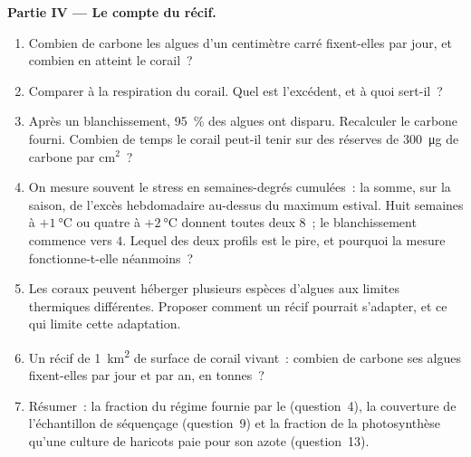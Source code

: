 \begin{problem}
\medskip
\noindent\textbf{Partie IV --- Le compte du récif.}
\begin{enumerate}[resume]
  \item Combien de carbone les algues d'un centimètre carré fixent-elles
        par jour, et combien en atteint le corail~?
  \item Comparer à la respiration du corail. Quel est l'excédent, et à
        quoi sert-il~?
  \item Après un blanchissement, \qty{95}{\%} des algues ont disparu.
        Recalculer le carbone fourni. Combien de temps le corail
        peut-il tenir sur des réserves de \qty{300}{\micro g} de
        carbone par cm$^{2}$~?
  \item On mesure souvent le stress en semaines-degrés cumulées~: la
        somme, sur la saison, de l'excès hebdomadaire au-dessus du
        maximum estival. Huit semaines à $+\qty{1}{\celsius}$ ou quatre
        à $+\qty{2}{\celsius}$ donnent toutes deux $8$~; le
        blanchissement commence vers $4$. Lequel des deux profils est le
        pire, et pourquoi la mesure fonctionne-t-elle néanmoins~?
  \item Les coraux peuvent héberger plusieurs espèces d'algues aux
        limites thermiques différentes. Proposer comment un récif
        pourrait s'adapter, et ce qui limite cette adaptation.
  \item Un récif de \qty{1}{km^2} de surface de corail vivant~: combien
        de carbone ses algues fixent-elles par jour et par an, en
        tonnes~?
  \item Résumer~: la fraction du régime fournie par le 
        (question~4), la couverture de l'échantillon de séquençage
        (question~9) et la fraction de la photosynthèse qu'une culture
        de haricots paie pour son azote (question~13).
\end{enumerate}
\end{problem}
